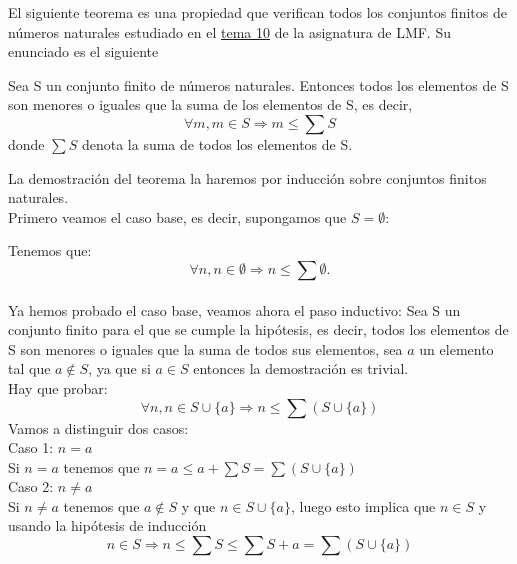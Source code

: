 %
\begin{isabellebody}%
%
%
\isadelimtheory
%
\endisadelimtheory
%
\isatagtheory
%
\endisatagtheory
{\isafoldtheory}%
%
\isadelimtheory
%
\endisadelimtheory
%
\isadelimdocument
%
\endisadelimdocument
%
\isatagdocument
%
\isamarkuptrue%
%
\endisatagdocument
{\isafolddocument}%
%
\isadelimdocument
%
\endisadelimdocument
%
\begin{isamarkuptext}%
El siguiente teorema es una propiedad que verifican todos los conjuntos finitos de números
  naturales  estudiado en el \href{http://bit.ly/2XBW6n2}{tema 10} de la
asignatura de LMF. Su enunciado es el siguiente 

  \begin{teorema} 
    Sea S un conjunto finito de números naturales.  Entonces todos los
 elementos de S son menores o iguales que la suma de los elementos de
 S, es decir, $$\forall m , m \in S \Longrightarrow m \leq \sum S$$ 
\newline
donde $\sum S $ denota la suma de todos los elementos de S.
  \end{teorema} 

\begin{demostracion}
La demostración del teorema la haremos por inducción sobre conjuntos
 finitos naturales.\\
Primero veamos el caso base, es decir, supongamos que $S = \emptyset$:

Tenemos que: $$\forall n, n \in \emptyset \Longrightarrow n \leq \sum
 \emptyset.$$\\
Ya hemos probado el caso base, veamos ahora el paso inductivo:
\newline
Sea S un conjunto finito para el que se cumple la hipótesis, es decir,
 todos los elementos de S son menores o iguales que la suma de todos sus
elementos, sea $a$ un elemento tal que $a \notin S$, ya que si $a \in S$
entonces la demostración es trivial.\\
Hay que probar: $$\forall n , n \in S \cup \{ a \} \Longrightarrow n
 \leq \sum (S \cup \{ a \})$$
Vamos a distinguir dos casos:\\
Caso 1: $n = a$ \\
Si $n = a$ tenemos que $n = a \leq a + \sum S = \sum ( S \cup \{ a
 \})$\\
Caso 2: $n \neq a$\\
Si $n \neq a$ tenemos que $a \notin S$ y que $n \in S \cup \{ a \}$,
 luego esto implica que $n \in S$ y usando la hipótesis de inducción
$$n \in S \Longrightarrow n \leq \sum S \leq \sum S + a = \sum (S \cup
 \{ a \})$$
\end{demostracion}


\end{isamarkuptext}
\end{isabellebody}
